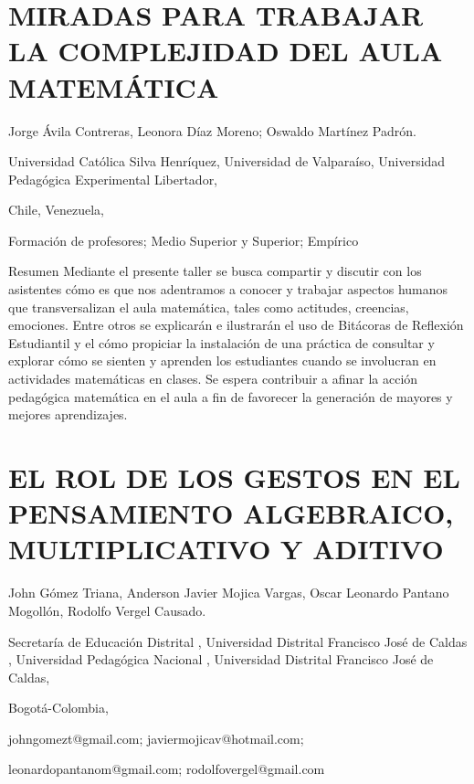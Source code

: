 \section{MIRADAS PARA TRABAJAR LA COMPLEJIDAD DEL AULA MATEMÁTICA }

\begin{datos}

Jorge Ávila Contreras, Leonora Díaz Moreno; Oswaldo Martínez Padrón.

Universidad Católica Silva Henríquez, Universidad de Valparaíso, Universidad
Pedagógica Experimental Libertador,

Chile, Venezuela,

\end{datos}

Formación de profesores; Medio Superior y Superior; Empírico

Resumen Mediante el presente taller se busca compartir y discutir
con los asistentes cómo es que nos adentramos a conocer y trabajar
aspectos humanos que transversalizan el aula matemática, tales como
actitudes, creencias, emociones. Entre otros se explicarán e ilustrarán
el uso de Bitácoras de Reflexión Estudiantil y el cómo propiciar la
instalación de una práctica de consultar y explorar cómo se sienten
y aprenden los estudiantes cuando se involucran en actividades matemáticas
en clases. Se espera contribuir a afinar la acción pedagógica matemática
en el aula a fin de favorecer la generación de mayores y mejores aprendizajes. 


\section{\uppercase{ El rol de los gestos en el pensamiento algebraico, multiplicativo
y aditivo}}

\begin{datos}

John Gómez Triana, Anderson Javier Mojica Vargas, Oscar Leonardo Pantano
Mogollón, Rodolfo Vergel Causado.

Secretaría de Educación Distrital , Universidad Distrital Francisco
José de Caldas , Universidad Pedagógica Nacional , Universidad Distrital
Francisco José de Caldas,

Bogotá-Colombia,

johngomezt@gmail.com; javiermojicav@hotmail.com;

leonardopantanom@gmail.com; rodolfovergel@gmail.com

\end{datos}

